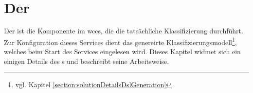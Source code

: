 \section{Der {\classificationService}}
    \label{section:solutionDetailsClassificationService}
    Der {\classificationService} ist die Komponente im \gls{wccs},
    die die tatsächliche Klassifizierung durchführt.
    Zur Konfiguration dieses Services dient das
    genereirte Klassifizierungsmodell\footnote{vgl. Kapitel \ref{section:solutionDetailsDslGeneration}},
    welches beim Start des Services eingelesen wird.
    Dieses Kapitel widmet sich ein einigen Details des {\classificationService}s
    und beschreibt seine Arbeitsweise.

    
    
    
